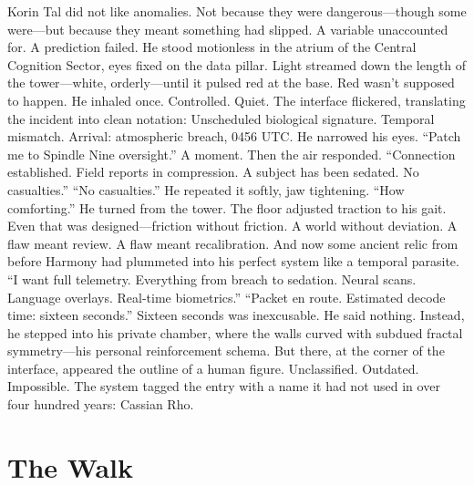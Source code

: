 \documentclass[12pt,oneside]{book}
\begin{document}
Korin Tal did not like anomalies.
Not because they were dangerous—though some were—but because they meant something had slipped. A variable unaccounted for. A prediction failed.
He stood motionless in the atrium of the Central Cognition Sector, eyes fixed on the data pillar. Light streamed down the length of the tower—white, orderly—until it pulsed red at the base.
Red wasn’t supposed to happen.
He inhaled once. Controlled. Quiet.
The interface flickered, translating the incident into clean notation:
Unscheduled biological signature.
 Temporal mismatch.
 Arrival: atmospheric breach, 0456 UTC.
He narrowed his eyes.
“Patch me to Spindle Nine oversight.”
A moment. Then the air responded.
“Connection established. Field reports in compression. A subject has been sedated. No casualties.”
“No casualties.” He repeated it softly, jaw tightening. “How comforting.”
He turned from the tower. The floor adjusted traction to his gait. Even that was designed—friction without friction. A world without deviation.
A flaw meant review. A flaw meant recalibration.
And now some ancient relic from before Harmony had plummeted into his perfect system like a temporal parasite.
“I want full telemetry. Everything from breach to sedation. Neural scans. Language overlays. Real-time biometrics.”
“Packet en route. Estimated decode time: sixteen seconds.”
Sixteen seconds was inexcusable.
He said nothing.
Instead, he stepped into his private chamber, where the walls curved with subdued fractal symmetry—his personal reinforcement schema.
But there, at the corner of the interface, appeared the outline of a human figure.
Unclassified.
Outdated.
Impossible.
The system tagged the entry with a name it had not used in over four hundred years:
Cassian Rho.



\chapter{The Walk}
\end{document}
